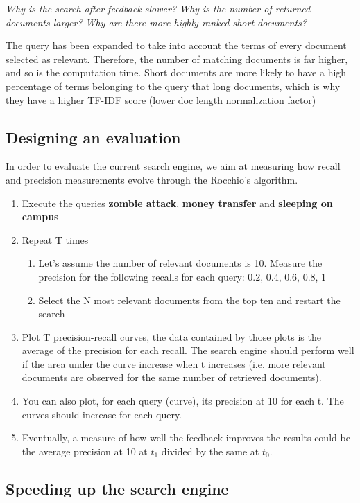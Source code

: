 \textit{Why is the search after feedback slower? Why is the number of returned documents larger? Why are there more highly ranked short documents?}

The query has been expanded to take into account the terms of every document selected as relevant. Therefore, the number of matching documents is far higher, and so is the computation time. Short documents are more likely to have a high percentage of terms belonging to the query that long documents, which is why they have a higher TF-IDF score (lower doc length normalization factor)


\subsection{Designing an evaluation}
In order to evaluate the current search engine, we aim at measuring how recall and precision measurements evolve through the Rocchio's algorithm.

\begin{enumerate}
\item Execute the queries \textbf{zombie attack}, \textbf{money transfer} and \textbf{sleeping on campus}
\item Repeat T times
\begin{enumerate}
    \item Let's assume the number of relevant documents is 10. Measure the precision for the following recalls for each query: 0.2, 0.4, 0.6, 0.8, 1
    \item Select the N most relevant documents from the top ten and restart the search
\end{enumerate}
\item Plot T precision-recall curves, the data contained by those plots is the average of the precision for each recall. The search engine should perform well if the area under the curve increase when t increases (i.e. more relevant documents are observed for the same number of retrieved documents).
\item You can also plot, for each query (curve), its precision at 10 for each t. The curves should increase for each query.
\item Eventually, a measure of how well the feedback improves the results could be the average precision at 10 at $t_1$ divided by the same at $t_0$.
\end{enumerate}


\subsection{Speeding up the search engine}

